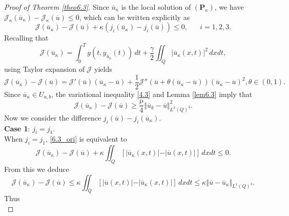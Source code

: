 \documentclass[10pt,a4paper]{amsart}
\begin{document}
	\begin{proof}[Proof of Theorem \ref{theo6.3}]
		Since $\overline{u}_\kappa$ is the local solution of $(\textbf{P}_\kappa)$, we have $\mathcal{J}_\kappa(\overline{u}_\kappa)- \mathcal{J}_\kappa(\overline{u}) \leq 0$, which can be written explicitly as
		\begin{equation} \label{6.3_ori}
			\mathcal{J}(\overline{u}_\kappa) - \mathcal{J}(\overline{u}) + \kappa \left(j_i(\overline{u}_{\kappa}) - j_i(\overline{u}) \right) \leq 0, \hspace{20pt} i=1,2,3.
		\end{equation}
		Recalling that \[ \mathcal{J}({\overline{u}_\kappa}) = \int_0^T g(t, y_{\overline{u}_\kappa}(t)) \, dt+ \frac{\gamma}{2} \iint_Q \vert \overline{u}_\kappa(x,t) \vert ^2 \, dxdt, \]
		using Taylor expansion of $\mathcal{J}$ yields
		\begin{equation*}
			\mathcal{J}({\overline{u}_\kappa}) - \mathcal{J}(\overline{u}) = \mathcal{J}'(\overline{u})(\overline{u}_\kappa - \overline{u}) + \frac{1}{2} \mathcal{J}''(\overline{u}+ \theta (\overline{u}_\kappa - \overline{u}))(\overline{u}_\kappa - \overline{u})^2, \theta\in (0,1).
		\end{equation*}
		Since $\overline{u}_\kappa \in U_{a,b}$, the variational inequality \eqref{4.3} and Lemma \ref{lem6.3} imply that
		\begin{equation*}
			\mathcal{J}(\overline{u}_\kappa) - \mathcal{J}(\overline{u}) \geq \frac{\mu}{4} \Vert \overline{u}_k - \overline{u} \Vert_{L^2(Q)^3}^2 .
		\end{equation*}
		Now we consider the difference $j_i(\overline{u})-j_i(\overline{u}_{\kappa})$. \\
		\textbf{Case 1}: $j_i=j_1$.\\
		When $j_i=j_1$, \eqref{6.3_ori} is equivalent to
		\begin{equation*}
			\mathcal{J}(\overline{u}_\kappa) - \mathcal{J}(\overline{u}) + \kappa \iint_Q \left[ \vert \overline{u}_\kappa(x,t) \vert  - \vert \overline{u}(x,t) \vert \right] \, dxdt \leq 0.
		\end{equation*}
		From this we deduce
		\begin{equation*}
			\mathcal{J}(\overline{u}_\kappa) -\mathcal{J}(\overline{u}) \leq \kappa \iint_Q \left[ \vert \overline{u}(x,t) \vert - \vert\overline{u}_\kappa(x,t) \vert \right] \, dxdt \leq \kappa \Vert \overline{u} - \overline{u}_\kappa \Vert_{L^1(Q)^3}.
		\end{equation*}
		Thus
		\begin{equation} \label{6.3.2}

\end{equation}
\end{proof}
\end{document}
